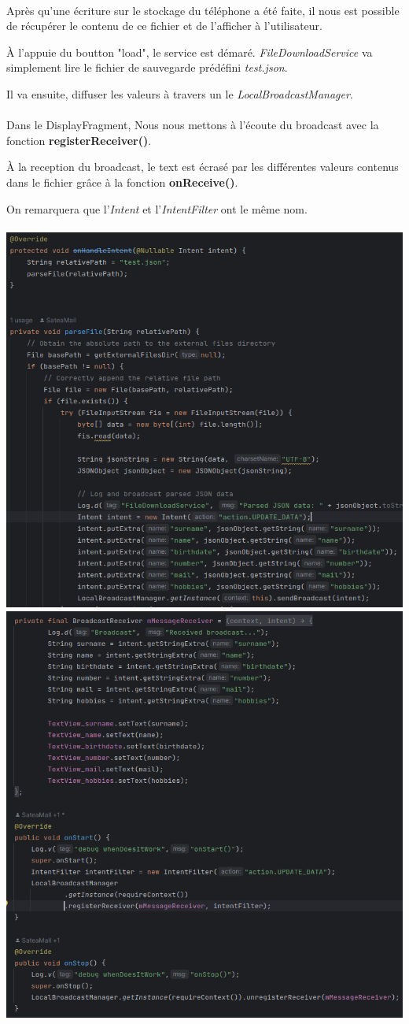 \documentclass[a4paper]{article}
\begin{document}
\begin{multicols}{2}
            \paragraph{}
                Après qu'une écriture sur le stockage du téléphone a été faite, il nous est possible de récupérer le contenu de ce fichier et de l'afficher à l'utilisateur.

                À l'appuie du boutton "load", le service est démaré. \emph{FileDownloadService} va simplement lire le fichier de sauvegarde prédéfini \emph{test.json}.

                Il va ensuite, diffuser les valeurs à travers un le \emph{LocalBroadcastManager}.
            \paragraph{}
                Dans le DisplayFragment, Nous nous mettons à l'écoute du broadcast avec la fonction \textbf{registerReceiver()}.

                À la reception du broadcast, le text est écrasé par les différentes valeurs contenus dans le fichier grâce à la fonction \textbf{onReceive()}.
                
                On remarquera que l'\emph{Intent} et l'\emph{IntentFilter} ont le même nom.
                \\\\
                \noindent\includegraphics[width=.47\textwidth]{load/FileDownloadService}
                \noindent\includegraphics[width=.47\textwidth]{load/broadcastReceive}

\end{multicols}
\end{document}
